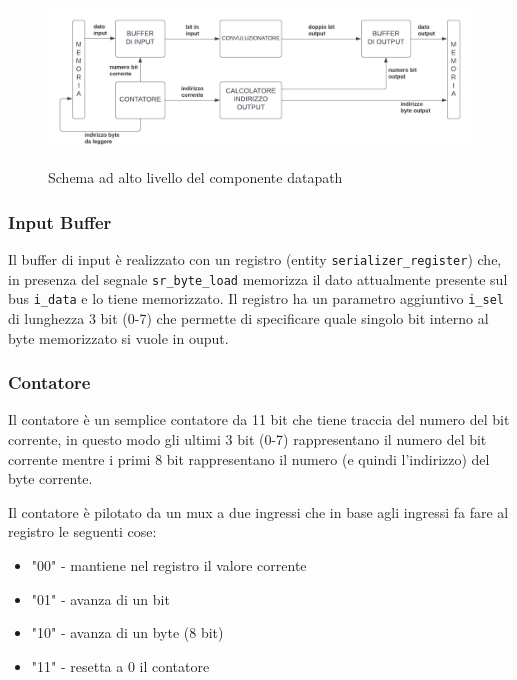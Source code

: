 \documentclass[12pt, a4paper]{article}
\begin{document}
\begin{figure}[h!]
    \centering
    \includegraphics[scale=0.32]{datapath.png}
    \label{fig:datapath_small}
    \caption{Schema ad alto livello del componente datapath} %
\end{figure}

\subsubsection{Input Buffer}

Il buffer di input è realizzato con un registro (entity \texttt{serializer\_register}) che, in presenza del segnale 
\texttt{sr\_byte\_load} memorizza il dato attualmente presente sul bus \texttt{i\_data} e lo tiene memorizzato.
Il registro ha un parametro aggiuntivo \texttt{i\_sel} di lunghezza 3 bit (0-7)
che permette di specificare quale singolo bit interno al byte memorizzato si vuole in ouput.

\subsubsection{Contatore}

Il contatore è un semplice contatore da 11 bit che tiene traccia del numero del bit corrente,
in questo modo gli ultimi 3 bit (0-7) rappresentano il numero del bit corrente
mentre i primi 8 bit rappresentano il numero (e quindi l'indirizzo) del byte corrente.
\pagebreak

\noindent Il contatore è pilotato da un mux a due ingressi che in base agli ingressi fa fare al registro le seguenti cose:
\begin{itemize}[itemsep=4pt, topsep=4pt]
    \item "00" - mantiene nel registro il valore corrente
    \item "01" - avanza di un bit
    \item "10" - avanza di un byte (8 bit)
    \item "11" - resetta a 0 il contatore
\end{itemize}
\end{document}
